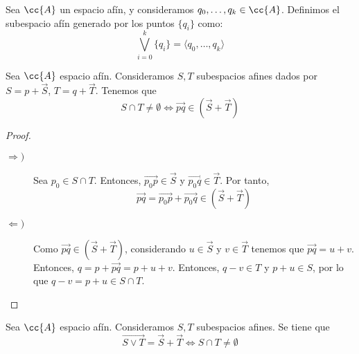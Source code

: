 \begin{notacion}
    Sea $\cc{A}$ un espacio afín, y consideramos $q_0,\dots,q_k\in \cc{A}$. Definimos el subespacio afín generado por los puntos $\{q_i\}$ como:
    \begin{equation*}
        \bigvee_{i=0}^k \{q_i\} = \langle q_0,\dots,q_k \rangle
    \end{equation*}
\end{notacion}


\begin{prop}\label{prop:IntersecNoVacia}
    Sea $\cc{A}$ espacio afín. Consideramos $S,T$ subespacios afines dados por $S=p+\vec{S}$, $T=q+\vec{T}$. Tenemos que
    $$S\cap T\neq \emptyset \Longleftrightarrow \vec{pq}\in \left(\vec{S}+\vec{T}\right)$$
\end{prop}
\begin{proof}\
    \begin{description}
        \item[$\Longrightarrow)$] Sea $p_0\in S\cap T$. Entonces, $\vec{p_0p}\in \vec{S}$ y $\vec{p_0q}\in \vec{T}$. Por tanto,
        $$\vec{pq}=\vec{p_0p}+\vec{p_0q}\in (\vec{S}+\vec{T})$$

        \item[$\Longleftarrow)$] Como $\vec{pq}\in (\vec{S}+\vec{T})$, considerando $u\in \vec{S}$ y $v\in \vec{T}$ tenemos que $\vec{pq}=u+v$. Entonces, $q=p+\vec{pq}=p+u+v$. Entonces, $q-v\in T$ y $p+u\in S$, por lo que $q-v=p+u\in S\cap T$.
    \end{description}
\end{proof}
\begin{coro}
    Sea $\cc{A}$ espacio afín. Consideramos $S,T$ subespacios afines. Se tiene que
    $$\vec{S\vee T} = \vec{S} + \vec{T} \Longleftrightarrow S\cap T\neq \emptyset$$
\end{coro}



